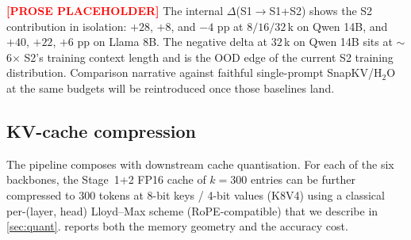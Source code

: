 \textcolor{red}{\textbf{[PROSE PLACEHOLDER]}} The internal $\Delta$(S1$\to$S1+S2) shows the S2 contribution in isolation: $+28$, $+8$, and $-4$ pp at $8/16/32$\,k on Qwen 14B, and $+40$, $+22$, $+6$ pp on Llama 8B. The negative delta at $32$\,k on Qwen 14B sits at $\sim$6$\times$ S2's training context length and is the OOD edge of the current S2 training distribution. Comparison narrative against faithful single-prompt SnapKV/H$_2$O at the same budgets will be reintroduced once those baselines land.


\subsection{KV-cache compression}\label{sec:compression}

The pipeline composes with downstream cache quantisation. For each of the six backbones, the Stage~1+2 FP16 cache of $k{=}300$ entries can be further compressed to $300$ tokens at 8-bit keys / 4-bit values (K8V4) using a classical per-(layer, head) Lloyd--Max scheme (RoPE-compatible) that we describe in \cref{sec:quant}.  reports both the memory geometry and the accuracy cost.

